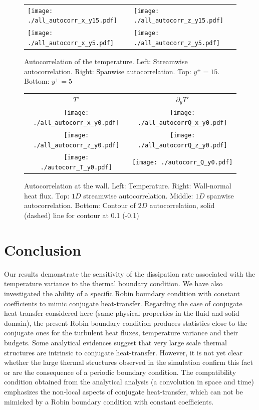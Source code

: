 \documentclass[review]{elsarticle}
\begin{document}
\begin{figure}[htbp]
\begin{tabular}[htbp]{ll}
\texttt{[image: ./all\_autocorr\_x\_y15.pdf]} &
\texttt{[image: ./all\_autocorr\_z\_y15.pdf]} \\
\texttt{[image: ./all\_autocorr\_x\_y5.pdf]} &
\texttt{[image: ./all\_autocorr\_z\_y5.pdf]}
\end{tabular}
\caption{Autocorrelation of the temperature. Left: Streamwise autocorrelation. Right: Spanwise autocorrelation. Top: $y^+=15$. Bottom: $y^+=5$}
\label{all_autocorr_y515}
\end{figure}

\begin{figure}[htbp]
\begin{tabular}[htbp]{cc}
$T'$ & $\partial_y T'$ \\
\texttt{[image: ./all\_autocorr\_x\_y0.pdf]} &
\texttt{[image: ./all\_autocorrQ\_x\_y0.pdf]} \\
\texttt{[image: ./all\_autocorr\_z\_y0.pdf]} &
\texttt{[image: ./all\_autocorrQ\_z\_y0.pdf]} \\
\texttt{[image: ./autocorr\_T\_y0.pdf]} &
\texttt{[image: ./autocorr\_Q\_y0.pdf]}
\end{tabular}
\caption{Autocorrelation at the wall. Left: Temperature. Right: Wall-normal heat flux. Top: $1D$ streamwise autocorrelation. Middle: $1D$ spanwise autocorrelation. Bottom: Contour of $2D$ autocorrelation, solid (dashed) line for contour at 0.1 (-0.1)}
\label{all_autocorr_y0}
\end{figure}

\section{Conclusion}

Our results demonstrate the sensitivity of the dissipation rate associated with the temperature variance to the thermal boundary condition.
We have also investigated the ability of a specific Robin boundary condition with constant coefficients to mimic conjugate heat-transfer.
Regarding the case of conjugate heat-transfer considered here (same physical properties in the fluid and solid domain), the present Robin boundary condition produces statistics close to the conjugate ones for the turbulent heat fluxes, temperature variance and their budgets.
Some analytical evidences suggest that very large scale thermal structures are intrinsic to conjugate heat-transfer.
However, it is not yet clear whether the large thermal structures observed in the simulation confirm this fact or are the consequence of a periodic boundary condition.
The compatibility condition obtained from the analytical analysis (a convolution in space and time) emphasizes the non-local aspects of conjugate heat-transfer, which can not be mimicked by a Robin boundary condition with constant coefficients.
\end{document}

